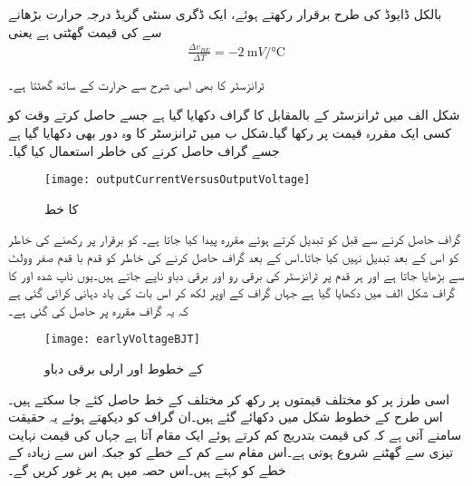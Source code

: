 بالکل ڈایوڈ کی طرح  برقرار رکھتے ہوئے،  ایک ڈگری سنٹی گریڈ درجہ حرارت بڑھانے سے   کی قیمت  گھٹتی ہے یعنی
\begin{align}
\frac{\Delta v_{BE}}{\Delta T}=\SI[per=frac,fraction=nice]{-2}{ \milli V \per \celsius}
\end{align}

 ٹرانزسٹر کا  بھی اسی شرح سے حرارت کے ساتھ گھٹتا ہے۔

شکل  الف میں  ٹرانزسٹر کے  بالمقابل  کا گراف دکھایا گیا ہے جسے حاصل کرتے وقت  کو کسی ایک مقررہ قیمت   پر رکھا گیا۔شکل  ب میں ٹرانزسٹر کا وہ دور بھی دکھایا گیا ہے جسے گراف حاصل کرنے کی خاطر استعمال کیا گیا۔
\begin{figure}
\centering
\texttt{[image: outputCurrentVersusOutputVoltage]}
\caption{ کا  خط}
\label{شکل_خارجی_برقی_رو_بالمقابل_برقی_دباو}
\end{figure}
گراف حاصل کرنے سے قبل  کو تبدیل کرتے ہوئے مقررہ  پیدا کیا جاتا ہے۔  کو برقرار  پر رکھنے کی خاطر  کو اس کے بعد تبدیل نہیں کیا جاتا۔اس کے بعد گراف حاصل کرنے کی خاطر   کو قدم با قدم صفر وولٹ   سے بڑھایا جاتا ہے اور ہر قدم پر ٹرانزسٹر کی برقی رو   اور برقی دباو  ناپے جاتے ہیں۔یوں ناپ شدہ  اور   کا گراف شکل  الف   میں دکھایا گیا ہے جہاں گراف کے اوپر  لکھ کر اس بات کی یاد دہانی کرائی گئی ہے کہ یہ گراف مقررہ  پر حاصل کی گئی ہے۔
\begin{figure}
\centering
\texttt{[image: earlyVoltageBJT]}
\caption{ کے خطوط اور ارلی برقی دباو}
\label{شکل_ارلی_برقی_دباو}
\end{figure}
اسی طرز پر  کو مختلف قیمتوں پر رکھ کر مختلف  کے خط حاصل کئے جا سکتے ہیں۔اس طرح کے خطوط شکل   میں دکھائے گئے ہیں۔ان گراف کو دیکھتے ہوئے یہ حقیقت سامنے آتی ہے کہ  کی قیمت بتدریج کم کرتے ہوئے ایک مقام آتا ہے جہاں   کی قیمت نہایت تیزی سے گھٹنے شروع ہوتی ہے۔اس مقام سے کم  کے خطے کو  جبکہ اس سے زیادہ  کے خطے کو   کہتے ہیں۔اس حصہ میں ہم  پر غور کریں گے۔

